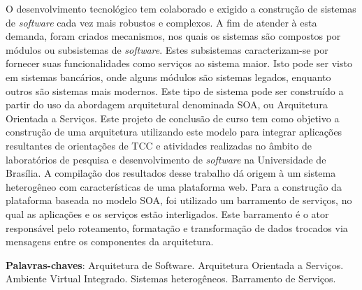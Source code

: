 \begin{resumo}

O desenvolvimento tecnológico tem colaborado e exigido a construção de sistemas de \textit{software} cada vez mais robustos e complexos. A fim de atender à esta demanda, foram criados mecanismos, nos quais os sistemas são compostos por módulos ou subsistemas de \textit{software}. Estes subsistemas caracterizam-se por fornecer suas funcionalidades como serviços ao sistema maior. Isto pode ser visto em sistemas bancários, onde alguns módulos são sistemas legados, enquanto outros são sistemas mais modernos. Este tipo de sistema pode ser construído a partir do uso da abordagem arquitetural denominada SOA, ou Arquitetura Orientada a Serviços. Este projeto de conclusão de curso tem como objetivo a construção de uma arquitetura utilizando este modelo para integrar aplicações resultantes de orientações de TCC e atividades realizadas no âmbito de laboratórios de pesquisa e desenvolvimento de \textit{software} na Universidade de Brasília. A compilação dos resultados desse trabalho dá origem à um sistema heterogêneo com características de uma plataforma web. Para a construção da plataforma baseada no modelo SOA, foi utilizado um barramento de serviços, no qual as aplicações e os serviços estão interligados. Este barramento é o ator responsável pelo roteamento, formatação e transformação de dados trocados via mensagens entre os componentes da arquitetura.

 \vspace{\onelineskip}
    
 \noindent
 \textbf{Palavras-chaves}: Arquitetura de Software. Arquitetura Orientada a Serviços. Ambiente Virtual Integrado. Sistemas heterogêneos. Barramento de Serviços.
\end{resumo}
